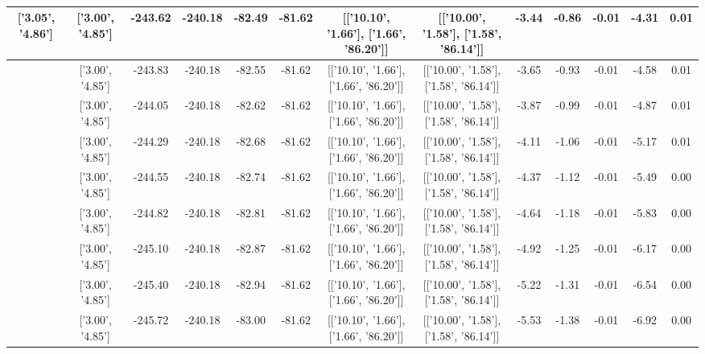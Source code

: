 \begin{table}[htbp]
\begin{adjustbox}{angle=90}
\begin{tabular}{|c|c|c|c|c|c|c|c|c|c|c|c|c|}
 ['3.05', '4.86'] & ['3.00', '4.85'] & -243.62 & -240.18 & -82.49 & -81.62 & [['10.10', '1.66'], ['1.66', '86.20']] & [['10.00', '1.58'], ['1.58', '86.14']] & -3.44 & -0.86 & -0.01 & -4.31 & 0.01\\ \hline
 ['3.05', '4.86'] & ['3.00', '4.85'] & -243.83 & -240.18 & -82.55 & -81.62 & [['10.10', '1.66'], ['1.66', '86.20']] & [['10.00', '1.58'], ['1.58', '86.14']] & -3.65 & -0.93 & -0.01 & -4.58 & 0.01\\ \hline
 ['3.06', '4.86'] & ['3.00', '4.85'] & -244.05 & -240.18 & -82.62 & -81.62 & [['10.10', '1.66'], ['1.66', '86.20']] & [['10.00', '1.58'], ['1.58', '86.14']] & -3.87 & -0.99 & -0.01 & -4.87 & 0.01\\ \hline
 ['3.06', '4.86'] & ['3.00', '4.85'] & -244.29 & -240.18 & -82.68 & -81.62 & [['10.10', '1.66'], ['1.66', '86.20']] & [['10.00', '1.58'], ['1.58', '86.14']] & -4.11 & -1.06 & -0.01 & -5.17 & 0.01\\ \hline
 ['3.07', '4.86'] & ['3.00', '4.85'] & -244.55 & -240.18 & -82.74 & -81.62 & [['10.10', '1.66'], ['1.66', '86.20']] & [['10.00', '1.58'], ['1.58', '86.14']] & -4.37 & -1.12 & -0.01 & -5.49 & 0.00\\ \hline
 ['3.07', '4.86'] & ['3.00', '4.85'] & -244.82 & -240.18 & -82.81 & -81.62 & [['10.10', '1.66'], ['1.66', '86.20']] & [['10.00', '1.58'], ['1.58', '86.14']] & -4.64 & -1.18 & -0.01 & -5.83 & 0.00\\ \hline
 ['3.07', '4.86'] & ['3.00', '4.85'] & -245.10 & -240.18 & -82.87 & -81.62 & [['10.10', '1.66'], ['1.66', '86.20']] & [['10.00', '1.58'], ['1.58', '86.14']] & -4.92 & -1.25 & -0.01 & -6.17 & 0.00\\ \hline
 ['3.08', '4.86'] & ['3.00', '4.85'] & -245.40 & -240.18 & -82.94 & -81.62 & [['10.10', '1.66'], ['1.66', '86.20']] & [['10.00', '1.58'], ['1.58', '86.14']] & -5.22 & -1.31 & -0.01 & -6.54 & 0.00\\ \hline
 ['3.08', '4.86'] & ['3.00', '4.85'] & -245.72 & -240.18 & -83.00 & -81.62 & [['10.10', '1.66'], ['1.66', '86.20']] & [['10.00', '1.58'], ['1.58', '86.14']] & -5.53 & -1.38 & -0.01 & -6.92 & 0.00\\ \hline
            \end{tabular}
        \end{adjustbox}
        \caption{}
        \label{}
    \end{table}
    